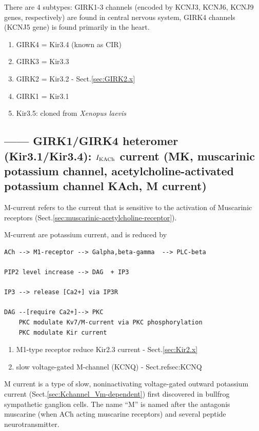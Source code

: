 There are 4 subtypes: GIRK1-3 channels (encoded by KCNJ3, KCNJ6, KCNJ9 genes,
respectively) are found in central nervous system, GIRK4 channels (KCNJ5 gene)
is found primarily in the heart.
\begin{enumerate}
  \item GIRK4 = Kir3.4   (known as CIR)
  \item GIRK3 = Kir3.3
  \item GIRK2 = Kir3.2 - Sect.\ref{sec:GIRK2.x}
  \item GIRK1 = Kir3.1

  \item Kir3.5: cloned from {\it Xenopus laevis}
\end{enumerate}




\subsection{------ GIRK1/GIRK4 heteromer (Kir3.1/Kir3.4): $I_{\text{{KACh}}}$ current (MK,
muscarinic potassium channel, acetylcholine-activated potassium channel KAch, M current)}
\label{sec:KACh-current}
\label{sec:IKAch_current}
\label{sec:MK-channel}
\label{sec:M-current}

M-current refers to the current that is sensitive to the activation of
Muscarinic receptors (Sect.\ref{sec:muscarinic-acetylcholine-receptor}).

M-current are potassium current, and is reduced by 
\begin{verbatim}
ACh --> M1-receptor --> Galpha,beta-gamma  --> PLC-beta

PIP2 level increase --> DAG  + IP3

IP3 --> release [Ca2+] via IP3R

DAG --[require Ca2+]--> PKC 
    PKC modulate Kv7/M-current via PKC phosphorylation
    PKC modulate Kir current
\end{verbatim}

\begin{enumerate}
  \item M1-type receptor reduce Kir2.3 current - Sect.\ref{sec:Kir2.x}
  
  \item slow voltage-gated M-channel (KCNQ) - Sect.ref{sec:KCNQ}
\end{enumerate}


M current is a type of slow, noninactivating voltage-gated outward potassium
current (Sect.\ref{sec:Kchannel_Vm-dependent}) first discovered in bullfrog
sympathetic ganglion cells. The name ``M'' is named after the antagonis
muscarine (when ACh acting muscarine receptors) and several peptide
neurotransmitter. 

